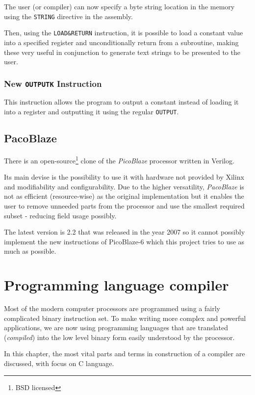         The user (or compiler) can now specify a byte string location in the memory using the \texttt{STRING} directive in the assembly.

        Then, using the \texttt{LOAD\&RETURN} instruction, it is possible to load a constant value into a specified register and unconditionally return from a subroutine, making these very useful in conjunction to generate text strings to be presented to the user.

        \subsection{New \texttt{OUTPUTK} Instruction}

        This instruction allows the program to output a constant instead of loading it into a register and outputting it using the regular \texttt{OUTPUT}.

    \section{PacoBlaze}

    There is an open-source\footnote{BSD licensed} clone of the \emph{PicoBlaze} processor written in Verilog.

    Its main devise is the possibility to use it with hardware not provided by Xilinx and modifiability and configurability. Due to the higher versatility, \emph{PacoBlaze} is not as efficient (resource-wise) as the original implementation but it enables the user to remove unneeded parts from the processor and use the smallest required subset - reducing field usage possibly.

    The latest version is 2.2 that was released in the year 2007 so it cannot possibly implement the new instructions of PicoBlaze-6 which this project tries to use as much as possible.

\chapter{Programming language compiler}

Most of the modern computer processors are programmed using a fairly complicated binary instruction set. To make writing more complex and powerful applications, we are now using programming languages that are translated (\emph{compiled}) into the low level binary form easily understood by the processor.

In this chapter, the most vital parts and terms in construction of a compiler are discussed, with focus on C language.

